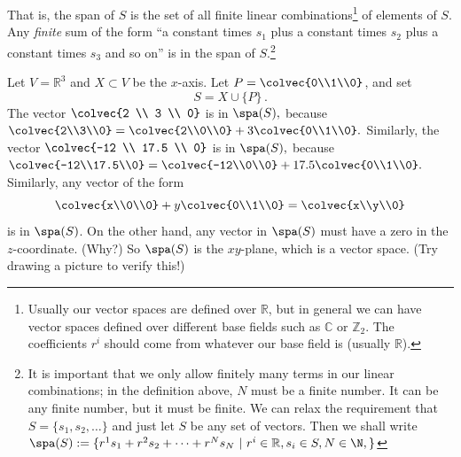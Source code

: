 That is, the span of \(S\) is the set of all finite linear combinations\footnote{Usually our vector spaces are defined over \(\mathbb{R}\), but in general we can have vector spaces defined over different base fields such as \(\mathbb{C}\) or \(\mathbb{Z}_2\). The coefficients \(r^i\) should come from whatever our base field is (usually \(\mathbb{R}\)).} of elements of \(S\). Any {\itshape finite} sum of the form ``a constant times \(s_1\) plus a constant times \(s_2\) plus a constant times \(s_3\) and so on'' is in the span of \(S\).\footnote{It is important that we only allow finitely many terms in our linear combinations; in the definition above, \(N\) must be a finite number. It can be any finite number, but it must be finite. We can relax the requirement that $S=\{s_1,s_2,\ldots\}$ and just let $S$ be any set of vectors. Then we shall write $\spa(S):=\{ r^1s_1+r^2s_2+\cdots + r^Ns_N ~|~ r^i\in \mathbb{R}, s_i\in S, N\in \N, \}$}

\begin{example}
Let $V=\mathbb{R}^3$ and $X\subset V$ be the $x$-axis.  Let $P=\colvec{0\\1\\0}$, and set \[S=X \cup \{P\}\, .\]
The vector \(\colvec{2 \\ 3 \\ 0}\) is in \(\spa(S),\) because \(\colvec{2\\3\\0}=\colvec{2\\0\\0}+3\colvec{0\\1\\0}.\) Similarly, the vector \(\colvec{-12 \\ 17.5 \\ 0}\) is in \(\spa(S),\) because \(\colvec{-12\\17.5\\0}=\colvec{-12\\0\\0}+17.5\colvec{0\\1\\0}.\)
Similarly, any vector of the form
\[
\colvec{x\\0\\0}+y \colvec{0\\1\\0} = \colvec{x\\y\\0}
\]
is in \(\spa(S)\). On the other hand, any vector in \(\spa(S)\) must have a zero in the \(z\)-coordinate. (Why?) 
So $\spa(S)$ is the $xy$-plane, which is a vector space.  (Try drawing a picture to verify this!)
\end{example}

